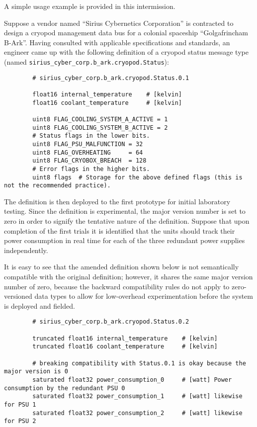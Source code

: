 \begin{remark}[breakable]
    A simple usage example is provided in this intermission.

    Suppose a vendor named ``Sirius Cybernetics Corporation'' is contracted to design a
    cryopod management data bus for a colonial spaceship ``Golgafrincham B-Ark''.
    Having consulted with applicable specifications and standards, an engineer came up with the following
    definition of a cryopod status message type (named \verb|sirius_cyber_corp.b_ark.cryopod.Status|):

    \begin{verbatim}
        # sirius_cyber_corp.b_ark.cryopod.Status.0.1

        float16 internal_temperature    # [kelvin]
        float16 coolant_temperature     # [kelvin]

        uint8 FLAG_COOLING_SYSTEM_A_ACTIVE = 1
        uint8 FLAG_COOLING_SYSTEM_B_ACTIVE = 2
        # Status flags in the lower bits.
        uint8 FLAG_PSU_MALFUNCTION = 32
        uint8 FLAG_OVERHEATING     = 64
        uint8 FLAG_CRYOBOX_BREACH  = 128
        # Error flags in the higher bits.
        uint8 flags  # Storage for the above defined flags (this is not the recommended practice).
    \end{verbatim}

    The definition is then deployed to the first prototype for initial laboratory testing.
    Since the definition is experimental, the major version number is set to zero in order to signify the
    tentative nature of the definition.
    Suppose that upon completion of the first trials it is identified that the units should track their
    power consumption in real time for each of the three redundant power supplies independently.

    It is easy to see that the amended definition shown below is not semantically compatible
    with the original definition; however, it shares the same major version number of zero, because the backward
    compatibility rules do not apply to zero-versioned data types to allow for low-overhead experimentation
    before the system is deployed and fielded.

    \begin{verbatim}
        # sirius_cyber_corp.b_ark.cryopod.Status.0.2

        truncated float16 internal_temperature    # [kelvin]
        truncated float16 coolant_temperature     # [kelvin]

        # breaking compatibility with Status.0.1 is okay because the major version is 0
        saturated float32 power_consumption_0     # [watt] Power consumption by the redundant PSU 0
        saturated float32 power_consumption_1     # [watt] likewise for PSU 1
        saturated float32 power_consumption_2     # [watt] likewise for PSU 2


\end{verbatim}
\end{remark}
